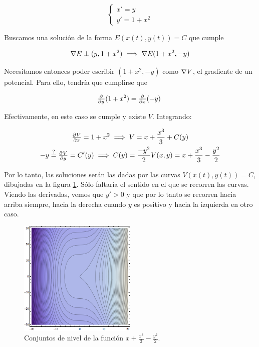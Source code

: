 \begin{example}
\[\begin{cases}x' = y \\ y' = 1+x^2 \end{cases} \]

Buscamos una solución de la forma $E(x(t), y(t)) = C$ que cumple

\[ \nabla E \perp (y, 1+x^2) \implies \nabla E (1+x^2,-y) \]

Necesitamos entonces poder escribir $(1+x^2,-y)$ como $\nabla V$, el gradiente de un potencial. Para ello, tendría que cumplirse que

\[ \pd{}{y}(1+x^2) = \pd{}{x}(-y) \]

Efectivamente, en este caso se cumple y existe $V$. Integrando:

\begin{gather*}
\pd{V}{x} = 1+x^2 \implies V = x + \frac{x^3}{3} + C(y) \\
-y \stackrel{?}{=} \pd{V}{y} = C'(y) \implies C(y) = \frac{-y^2}{2}
V(x,y) = x + \frac{x^3}{3} -\frac{y^2}{2}
\end{gather*}

Por lo tanto, las soluciones serán las dadas por las curvas $V(x(t), y(t)) = C$, dibujadas en la figura \ref{imgGranos}. Sólo faltaría el sentido en el que se recorren las curvas. Viendo las derivadas, vemos que $y'>0$ y que por lo tanto se recorren hacia arriba siempre, hacia la derecha cuando $y$ es positivo y hacia la izquierda en otro caso.

\end{example}

\begin{figure}
\centering
\includegraphics[width=0.5\textwidth]{img/Grano.png}
\caption{Conjuntos de nivel de la función $x + \frac{x^3}{3} -\frac{y^2}{2}$.}
\label{imgGranos}
\end{figure}

